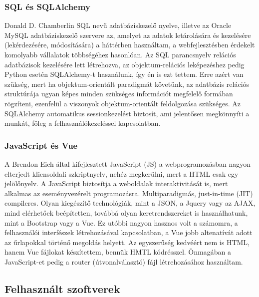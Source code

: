 \documentclass[12pt,a4paper]{report}
\begin{document}
\subsubsection{SQL és SQLAlchemy}

Donald D. Chamberlin SQL nevű adatbáziskezelő nyelve, illetve az Oracle MySQL 
adatbáziskezelő szervere az, amelyet az adatok letárolására és kezelésére (lekérdezésére, 
módosítására) a háttérben használtam, a webfejlesztésben érdekelt komolyabb vállalatok 
többségéhez hasonlóan. Az SQL parancsnyelv relációs adatbázisok kezelésére lett létrehozva, 
az objektum-relációs leképezéshez pedig Python esetén SQLAlchemy-t használunk, így én is ezt 
tettem. Erre azért van szükség, mert ha objektum-orientált paradigmát követünk, az adatbázis 
relációs struktúrája ugyan képes minden szükséges információt megfelelő formában rögzíteni, 
ezenfelül a viszonyok objektum-orientált feldolgozása szükséges. Az SQLAlchemy automatikus 
sessionkezelést biztosít, ami jelentősen megkönnyíti a munkát, főleg a felhasználókezeléssel 
kapcsolatban.

\subsubsection{JavaScript és Vue}

A Brendon Eich által kifejlesztett JavaScript (JS) a webprogramozásban nagyon elterjedt
kliensoldali szkriptnyelv, nehéz megkerülni, mert a HTML csak egy jelölőnyelv. A JavaScript 
biztosítja a weboldalak interaktivitását is, mert alkalmas az eseményvezérelt programozásra. 
Multiparadigmás, just-in-time (JIT) compileres. Olyan kiegészítő technológiák, mint a JSON, 
a Jquery vagy az AJAX, mind elérhetőek beépítetten, továbbá olyan keretrendszereket is 
használhatunk, mint a Bootstrap vagy a Vue. Ez utóbbi nagyon hasznos volt a számomra, a 
felhasználói interfészek létrehozásával kapcsolatban, a Vue jobb altenatívát adott az 
űrlapokkal történő megoldás helyett. Az egyszerűség kedvéért nem is HTML, hanem Vue fájlokat
készítettem, bennük HMTL kódrésszel. Önmagában a JavaScript-et pedig a router 
(útvonalválasztó) fájl létrehozásához használtam.

\subsection{Felhasznált szoftverek}
\end{document}

